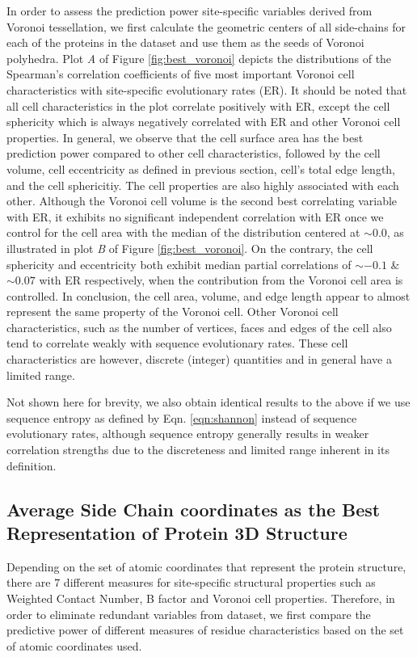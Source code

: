 \documentclass[11pt]{article}
\begin{document}
    In order to assess the prediction power site-specific variables derived from Voronoi tessellation, we first calculate the geometric centers of all side-chains for each of the proteins in the dataset and use them as the seeds of Voronoi polyhedra. Plot {\it A} of Figure \ref{fig:best_voronoi} depicts the distributions of the Spearman's correlation coefficients of five most important Voronoi cell characteristics with site-specific evolutionary rates (ER). It should be noted that all cell characteristics in the plot correlate positively with ER, except the cell sphericity which is always negatively correlated with ER and other Voronoi cell properties. In general, we observe that the cell surface area has the best prediction power compared to other cell characteristics, followed by the cell volume, cell eccentricity as defined in previous section, cell's total edge length, and the cell sphericitiy. The cell properties are also highly associated with each other. Although the Voronoi cell volume is the second best correlating variable with ER, it exhibits no significant independent correlation with ER once we control for the cell area with the median of the distribution centered at $\sim0.0$, as illustrated in plot {\it B} of Figure \ref{fig:best_voronoi}. On the contrary, the cell sphericity and eccentricity both exhibit median partial correlations of $\sim-0.1$ \& $\sim0.07$ with ER respectively, when the contribution from the Voronoi cell area is controlled. In conclusion, the cell area, volume, and edge length appear to almost represent the same property of the Voronoi cell. Other Voronoi cell characteristics, such as the number of vertices, faces and edges of the cell also tend to correlate weakly with sequence evolutionary rates. These cell characteristics are however, discrete (integer) quantities and in general have a limited range.
    
    Not shown here for brevity, we also obtain identical results to the above if we use sequence entropy as defined by Eqn. \ref{eqn:shannon} instead of sequence evolutionary rates, although sequence entropy generally results in weaker correlation strengths due to the discreteness and limited range inherent in its definition.
    
    \subsection*{Average Side Chain coordinates as the Best Representation of Protein 3D Structure}

        Depending on the set of atomic coordinates that represent the protein structure, there are $7$ different measures for site-specific structural properties such as Weighted Contact Number, B factor and Voronoi cell properties. Therefore, in order to eliminate redundant variables from dataset, we first compare the predictive power of different measures of residue characteristics based on the set of atomic coordinates used.
        \\
\end{document}

